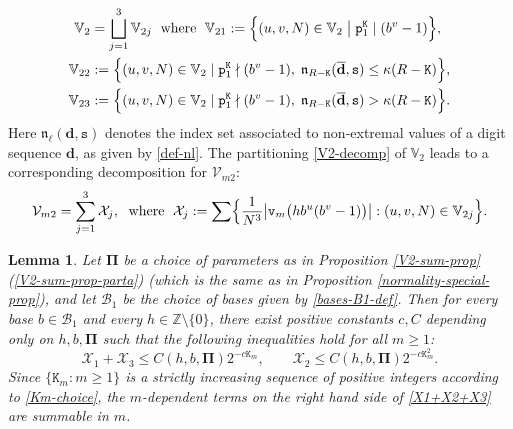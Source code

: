 \documentclass[12pt, twoside]{article}
\newtheorem{lemma}[theorem]{Lemma}
\theoremstyle{definition}
\numberwithin{equation}{section}
\begin{document}
\begin{align} 
\mathbb V_2 &= \bigsqcup_{j=1}^{3} \mathbb V_{2j} \; \text{ where } \; \mathbb V_{21} := \Bigl\{(u, v, N) \in \mathbb V_2\; \big| \; \mathtt p_{1}^{\mathtt K} \mid (b^v-1) \Bigr\}, \label{V2-decomp}  \\ 
\mathbb V_{22} &:= \Bigl\{(u, v, N) \in \mathbb V_2 \; | \; \mathtt p_{1}^{\mathtt K} \nmid (b^v-1), \; {\mathfrak n_{R-\mathtt K} (\overline{\mathbf d}, \mathtt s )} \leq \kappa (R-\mathtt K)  \Bigr\}, \label{def-V22} \\
\mathbb V_{23} &:= \Bigl\{(u, v, N) \in \mathbb V_2 \; |  \; \mathtt p_{1}^{\mathtt K} \nmid (b^v-1), \; {\mathfrak n_{R-\mathtt K} (\overline{\mathbf d}, \mathtt s )} > \kappa (R - \mathtt K)  \Bigr\}. \label{def-V23}
\end{align}   
Here $\mathfrak n_{\ell}(\mathbf d, \mathtt s)$ denotes the index set associated to non-extremal values of a digit sequence $\mathbf d$, as given by \eqref{def-nl}. The partitioning \eqref{V2-decomp} of $\mathbb V_{2}$ leads to a corresponding decomposition for $\mathcal V_{m2}$:
\begin{equation} \label{Xj-def}
\mathcal V_{m2} = \sum_{j=1}^{3} \mathcal X_j, \; \text{ where } \; \mathcal X_j := \sum \Bigl\{\frac{1}{N^3}\bigl| \mathtt v_m \bigl(hb^u(b^v-1) \bigr) \bigr| : (u, v, N) \in \mathbb V_{2j}\Bigr\}.  
\end{equation} 
\begin{lemma} \label{X1-X2-X3-lemma}
Let $\pmb{\Pi}$ be a choice of parameters as in Proposition \ref{V2-sum-prop}(\ref{V2-sum-prop-parta})  (which is the same as in Proposition \ref{normality-special-prop}), and let $\mathscr{B}_1$ be the choice of bases given by \eqref{bases-B1-def}. Then for every base $b \in \mathscr{B}_1$ and every $h \in \mathbb Z \setminus \{0\}$,  there exist positive constants $c, C$ depending only on $h, b, \pmb{\Pi}$ such that the following inequalities hold for all $m \geq 1$:
\begin{equation} \label{X1+X2+X3}
\mathcal X_1 + \mathcal X_3  \leq C(h, b, \pmb{\Pi}) 2^{-c \mathtt K_m}, \qquad \mathcal X_2 \leq C(h, b, \pmb{\Pi}) 2^{-c\mathtt K_m^2}.
\end{equation} 
 Since $\{\mathtt K_m : m \geq 1\}$ is a strictly increasing sequence of positive integers according to \eqref{Km-choice}, the $m$-dependent terms on the right hand side of \eqref{X1+X2+X3} are summable in $m$. 
\end{lemma} 
\end{document}
